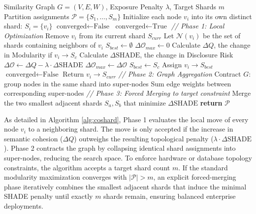 \begin{algorithm}[H]
\caption{The CoShard Partitioning Algorithm}
\renewcommand{\algorithmicrequire}{\textbf{Input:}}
\renewcommand{\algorithmicensure}{\textbf{Output:}}
\begin{algorithmic}[1]
\REQUIRE Similarity Graph $G=(V, E, W)$, Exposure Penalty $\lambda$, Target Shards $m$
\ENSURE Partition assignments $\mathcal{P} = \{S_1, \dots, S_m\}$
\STATE Initialize each node $v_i$ into its own distinct shard: $S_i = \{v_i\}$
\STATE $\text{converged} \leftarrow \text{False}$
    \STATE $\text{converged} \leftarrow \text{True}$
    \STATE \textit{// Phase 1: Local Optimization}
        \STATE Remove $v_i$ from its current shard $S_{curr}$
        \STATE Let $\mathcal{N}(v_i)$ be the set of shards containing neighbors of $v_i$
        \STATE $S_{best} \leftarrow \emptyset$
        \STATE $\Delta \mathcal{O}_{max} \leftarrow 0$
            \STATE Calculate $\Delta Q$, the change in Modularity if $v_i \to S_c$
            \STATE Calculate $\Delta \text{SHADE}$, the change in Disclosure Risk
            \STATE $\Delta \mathcal{O} \leftarrow \Delta Q - \lambda \cdot \Delta \text{SHADE}$
                \STATE $\Delta \mathcal{O}_{max} \leftarrow \Delta \mathcal{O}$
                \STATE $S_{best} \leftarrow S_c$
            \ENDIF
        \ENDFOR
            \STATE Assign $v_i \to S_{best}$
            \STATE $\text{converged} \leftarrow \text{False}$
        \ELSE
            \STATE Return $v_i \to S_{curr}$
        \ENDIF
    \ENDFOR
    \STATE \textit{// Phase 2: Graph Aggregation}
        \STATE Contract $G$: group nodes in the same shard into super-nodes
        \STATE Sum edge weights between corresponding super-nodes
    \ENDIF
\ENDWHILE
{}
    \STATE \textit{// Phase 3: Forced Merging to target constraint}
    \STATE Merge the two smallest adjacent shards $S_a, S_b$ that minimize $\Delta \text{SHADE}$
\ENDWHILE
\STATE \textbf{return} $\mathcal{P}$
\end{algorithmic}
\label{alg:coshard}
\end{algorithm}

As detailed in Algorithm \ref{alg:coshard}, Phase 1 evaluates the local move of every node $v_i$ to a neighboring shard. The move is only accepted if the increase in semantic cohesion ($\Delta Q$) outweighs the resulting topological penalty ($\lambda \cdot \Delta \text{SHADE}$). Phase 2 contracts the graph by collapsing identical shard assignments into super-nodes, reducing the search space. To enforce hardware or database topology constraints, the algorithm accepts a target shard count $m$. If the standard modularity maximization converges with $|\mathcal{P}| > m$, an explicit forced-merging phase iteratively combines the smallest adjacent shards that induce the minimal SHADE penalty until exactly $m$ shards remain, ensuring balanced enterprise deployments.


